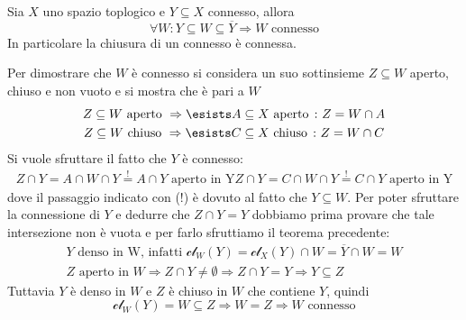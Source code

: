 \begin{theorema}
	Sia $X$ uno spazio toplogico e $Y\subseteq X$ connesso, allora 
		\begin{equation*}
			\forall W \colon Y\subseteq W \subseteq \overline{Y} \Rightarrow W \text{ connesso}
		\end{equation*}
	In particolare la chiusura di un connesso è connessa.
\end{theorema}
\begin{demonstration}
	Per dimostrare che $W$ è connesso si considera un suo sottinsieme $Z\subseteq W$ aperto, chiuso e non vuoto e si mostra che è pari a $W$
		\begin{gather*}
			Z\subseteq W \text{ aperto } \Rightarrow \esists A\subseteq X \text{ aperto } \colon Z=W\cap A \\
			Z\subseteq W \text{ chiuso } \Rightarrow \esists C\subseteq X \text{ chiuso } \colon Z=W\cap C
		\end{gather*}
	Si vuole sfruttare il fatto che $Y$ è connesso:
		\begin{gather*}
			Z\cap Y=A\cap W\cap Y \stackrel{!}{=} A\cap Y \text{ aperto in Y}
			Z\cap Y=C\cap W\cap Y \stackrel{!}{=} C\cap Y \text{ aperto in Y}			
		\end{gather*}
	dove il passaggio indicato con (!) è dovuto al fatto che $Y\subseteq W$. Per poter sfruttare la connessione di $Y$ e dedurre che $Z\cap Y=Y$ dobbiamo prima provare che tale intersezione non è vuota e per farlo sfruttiamo il teorema precedente:
		\begin{gather*}
			Y \text{ denso in W, infatti  } \mathcal{cl}_W(Y)=\mathcal{cl}_X(Y)\cap W=\overline{Y}\cap W=W\\
			Z \text{ aperto in } W \Rightarrow Z\cap Y \neq \emptyset \Rightarrow Z\cap Y=Y \Rightarrow Y\subseteq Z
		\end{gather*}
	Tuttavia $Y$ è denso in $W$ e $Z$ è chiuso in $W$ che contiene $Y$, quindi 
		\begin{equation*}
			\mathcal{cl}_W(Y)=W\subseteq Z \Rightarrow W=Z \Rightarrow W \text{ connesso}
		\end{equation*}
\end{demonstration}

